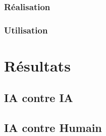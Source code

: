 \documentclass[report, backcover, french, nodocumentinfo]{upmethodology-document}
\begin{document}
			\subsection{Réalisation}
			\subsection{Utilisation}
	\chapter{Résultats}
		\section{IA contre IA}
		\section{IA contre Humain}
\end{document}
